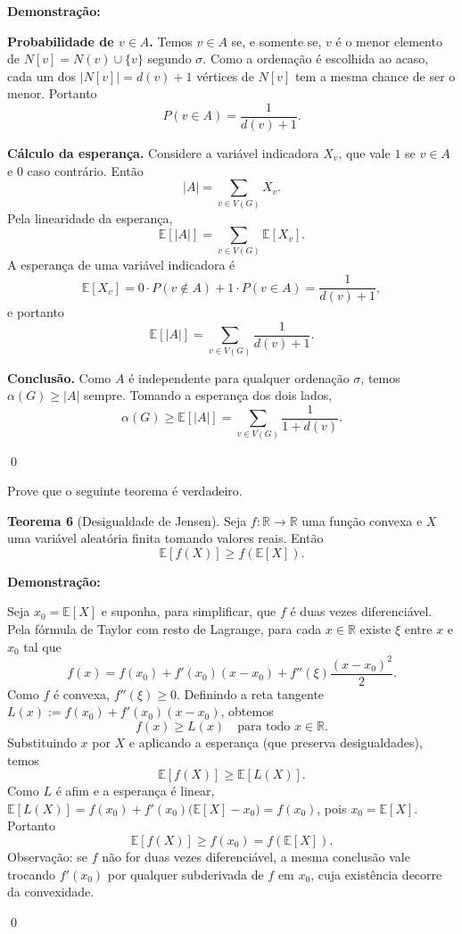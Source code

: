 \documentclass[12pt]{article}
\newenvironment{problem}[2][Exercício]{\begin{trivlist}
\item[\hskip \labelsep {\bfseries #1}\hskip \labelsep {\bfseries #2.}]}{\end{trivlist}}
\newenvironment{sol}
    {\textbf{Demonstração:}\emph{}
    }
    {
    \qed
    }
\begin{document}
\begin{sol}
    \textbf{Probabilidade de $v\in A$.} Temos $v\in A$ se, e somente se, $v$ é o menor elemento de $N[v] = N(v)\cup\{v\}$ segundo $\sigma$. Como a ordenação é escolhida ao acaso, cada um dos $|N[v]| = d(v)+1$ vértices de $N[v]$ tem a mesma chance de ser o menor. Portanto
    \[
        P(v\in A) = \frac{1}{d(v)+1}.
    \]

    \textbf{Cálculo da esperança.} Considere a variável indicadora $X_v$, que vale $1$ se $v\in A$ e $0$ caso contrário. Então
    \[
        |A| = \sum_{v\in V(G)} X_v.
    \]
    Pela linearidade da esperança,
    \[
        \mathbb{E}[|A|] = \sum_{v\in V(G)} \mathbb{E}[X_v].
    \]
    A esperança de uma variável indicadora é
    \[
        \mathbb{E}[X_v] = 0\cdot P(v\notin A) + 1\cdot P(v\in A) = \frac{1}{d(v)+1},
    \]
    e portanto
    \[
        \mathbb{E}[|A|] = \sum_{v\in V(G)} \frac{1}{d(v)+1}.
    \]

    \textbf{Conclusão.} Como $A$ é independente para qualquer ordenação $\sigma$, temos $\alpha(G)\geq |A|$ sempre. Tomando a esperança dos dois lados,
    \[
        \alpha(G) \geq \mathbb{E}[|A|] = \sum_{v\in V(G)} \frac{1}{1+d(v)}.
    \]
\end{sol}

\begin{problem}{11}
    Prove que o seguinte teorema é verdadeiro.
    
    \textbf{Teorema 6} (Desigualdade de Jensen). Seja $f \colon \mathbb{R} \to \mathbb{R}$ uma função convexa e $X$ uma variável aleatória finita tomando valores reais. Então
    \[
        \mathbb{E}[f(X)] \ge f(\mathbb{E}[X]).
    \]
\end{problem}
\begin{sol}
    Seja $x_0 = \mathbb{E}[X]$ e suponha, para simplificar, que $f$ é duas vezes diferenciável. Pela fórmula de Taylor com resto de Lagrange, para cada $x\in\mathbb{R}$ existe $\xi$ entre $x$ e $x_0$ tal que
    \[
        f(x) = f(x_0) + f'(x_0)(x-x_0) + f''(\xi)\frac{(x-x_0)^2}{2}.
    \]
    Como $f$ é convexa, $f''(\xi)\ge 0$. Definindo a reta tangente $L(x) := f(x_0) + f'(x_0)(x-x_0)$, obtemos
    \[
        f(x) \ge L(x) \quad \text{para todo } x\in\mathbb{R}.
    \]
    Substituindo $x$ por $X$ e aplicando a esperança (que preserva desigualdades), temos
    \[
        \mathbb{E}[f(X)] \ge \mathbb{E}[L(X)].
    \]
    Como $L$ é afim e a esperança é linear, $\mathbb{E}[L(X)] = f(x_0) + f'(x_0)\bigl(\mathbb{E}[X]-x_0\bigr) = f(x_0)$, pois $x_0 = \mathbb{E}[X]$. Portanto
    \[
        \mathbb{E}[f(X)] \ge f(x_0) = f(\mathbb{E}[X]).
    \]
    Observação: se $f$ não for duas vezes diferenciável, a mesma conclusão vale trocando $f'(x_0)$ por qualquer subderivada de $f$ em $x_0$, cuja existência decorre da convexidade.
\end{sol}
\end{document}
